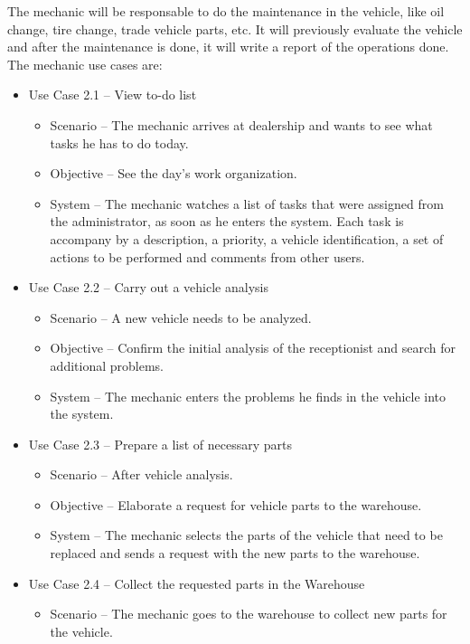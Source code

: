   The mechanic will be responsable to do the maintenance in the vehicle, like oil change, tire change, trade vehicle parts, etc. 
  It will previously evaluate the vehicle and after the maintenance is done, it will write a report of the operations done. 
  The mechanic use cases are:

  \begin{itemize}
    \item Use Case 2.1 – View to-do list
    \begin{itemize}
      \item Scenario – The mechanic arrives at dealership and wants to see what tasks he has to do today.
      \item Objective – See the day's work organization.
      \item System – The mechanic watches a list of tasks that were assigned from the administrator, as soon as he enters the system. Each task is accompany by a description, a priority, a vehicle identification, a set of actions to be performed and comments from other users. 
    \end{itemize}
    \item Use Case 2.2 – Carry out a vehicle analysis 
    \begin{itemize}
      \item Scenario – A new vehicle needs to be analyzed.
      \item Objective – Confirm the initial analysis of the receptionist and search for additional problems.
      \item System – The mechanic enters the problems he finds in the vehicle into the system. 
    \end{itemize}
    \item Use Case 2.3 – Prepare a list of necessary parts
    \begin{itemize}
      \item Scenario – After vehicle analysis.
      \item Objective – Elaborate a request for vehicle parts to the warehouse.
      \item System – The mechanic selects the parts of the vehicle that need to be replaced and sends a request with the new parts to the warehouse.
    \end{itemize}
    \item Use Case 2.4 – Collect the requested parts in the Warehouse
    \begin{itemize}
      \item Scenario – The mechanic goes to the warehouse to collect new parts for the vehicle.

\end{itemize}
\end{itemize}
